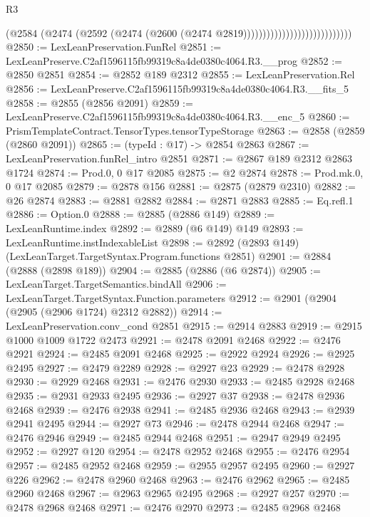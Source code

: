\begin{lexlean}{R3}
\begin{coremodule}
                                                (@2584
                                                  (@2474
                                                    (@2592
                                                      (@2474
                                                        (@2600
                                                          (@2474 @2819))))))))))))))))))))))))))))
@2850 := LexLeanPreservation.FunRel
@2851 := LexLeanPreserve.C2af1596115fb99319c8a4de0380c4064.R3.__prog
@2852 := @2850 @2851
@2854 := @2852 @189 @2312
@2855 := LexLeanPreservation.Rel
@2856 := LexLeanPreserve.C2af1596115fb99319c8a4de0380c4064.R3.__fits_5
@2858 := @2855 (@2856 @2091)
@2859 := LexLeanPreserve.C2af1596115fb99319c8a4de0380c4064.R3.__enc_5
@2860 := PrismTemplateContract.TensorTypes.tensorTypeStorage
@2863 := @2858 (@2859 (@2860 @2091))
@2865 := (typeId : @17) -> @2854 @2863
@2867 := LexLeanPreservation.funRel_intro @2851
@2871 := @2867 @189 @2312 @2863 @1724
@2874 := Prod.{0, 0} @17 @2085
@2875 := @2 @2874
@2878 := Prod.mk.{0, 0} @17 @2085
@2879 := @2878 @156
@2881 := @2875 (@2879 @2310)
@2882 := @26 @2874
@2883 := @2881 @2882
@2884 := @2871 @2883
@2885 := Eq.refl.{1}
@2886 := Option.{0}
@2888 := @2885 (@2886 @149)
@2889 := LexLeanRuntime.index
@2892 := @2889 (@6 @149) @149
@2893 := LexLeanRuntime.instIndexableList
@2898 := @2892 (@2893 @149) (LexLeanTarget.TargetSyntax.Program.functions @2851)
@2901 := @2884 (@2888 (@2898 @189))
@2904 := @2885 (@2886 (@6 @2874))
@2905 := LexLeanTarget.TargetSemantics.bindAll
@2906 := LexLeanTarget.TargetSyntax.Function.parameters
@2912 := @2901 (@2904 (@2905 (@2906 @1724) @2312 @2882))
@2914 := LexLeanPreservation.conv_cond @2851
@2915 := @2914 @2883
@2919 := @2915 @1000 @1009 @1722 @2473
@2921 := @2478 @2091 @2468
@2922 := @2476 @2921
@2924 := @2485 @2091 @2468
@2925 := @2922 @2924
@2926 := @2925 @2495
@2927 := @2479 @2289
@2928 := @2927 @23
@2929 := @2478 @2928
@2930 := @2929 @2468
@2931 := @2476 @2930
@2933 := @2485 @2928 @2468
@2935 := @2931 @2933 @2495
@2936 := @2927 @37
@2938 := @2478 @2936 @2468
@2939 := @2476 @2938
@2941 := @2485 @2936 @2468
@2943 := @2939 @2941 @2495
@2944 := @2927 @73
@2946 := @2478 @2944 @2468
@2947 := @2476 @2946
@2949 := @2485 @2944 @2468
@2951 := @2947 @2949 @2495
@2952 := @2927 @120
@2954 := @2478 @2952 @2468
@2955 := @2476 @2954
@2957 := @2485 @2952 @2468
@2959 := @2955 @2957 @2495
@2960 := @2927 @226
@2962 := @2478 @2960 @2468
@2963 := @2476 @2962
@2965 := @2485 @2960 @2468
@2967 := @2963 @2965 @2495
@2968 := @2927 @257
@2970 := @2478 @2968 @2468
@2971 := @2476 @2970
@2973 := @2485 @2968 @2468

\end{coremodule}
\end{lexlean}
